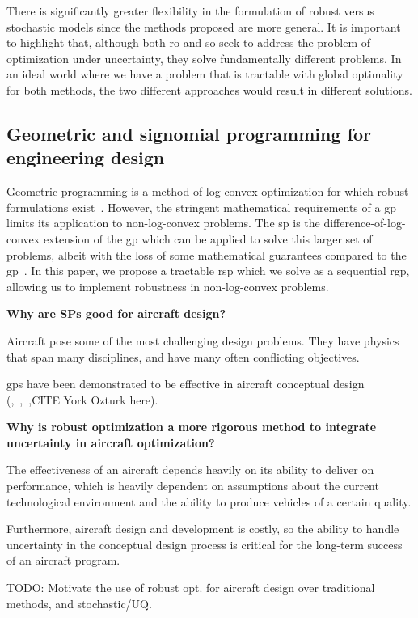 There is significantly greater flexibility in the formulation of robust versus stochastic models
since the methods proposed are more general. It is important to highlight that,
although both \gls{ro} and \gls{so} seek to address the problem
of optimization under uncertainty, they solve fundamentally different problems. In an ideal world where
we have a problem that is tractable with global optimality for both methods, the two different
approaches would result in different solutions.

\subsection{Geometric and signomial programming for engineering design}

Geometric programming is a method of log-convex optimization for which robust formulations exist~\cite{Saab2018}.
However, the stringent mathematical requirements of a \gls{gp} limits its application to non-log-convex problems.
The \gls{sp} is the difference-of-log-convex extension of the \gls{gp} which can be applied to
solve this larger set of problems, albeit with the loss of some mathematical guarantees compared to the \gls{gp}~\cite{Kirschen2016}.
In this paper, we propose a tractable \gls{rsp} which we solve as a sequential \gls{rgp},
allowing us to implement robustness in non-log-convex problems.

\textbf{Why are SPs good for aircraft design?}

Aircraft pose some of the most challenging design problems. They have physics that span many disciplines,
and have many often conflicting objectives.

\gls{gp}s have been demonstrated to be effective in aircraft conceptual design
(\cite{Hoburg2013},~\cite{Burton2017},~\cite{Kirschen2017},CITE York Ozturk here).

\textbf{Why is robust optimization a more rigorous method to integrate uncertainty in aircraft optimization?}

The effectiveness of an aircraft depends heavily on its
ability to deliver on performance, which is heavily dependent on assumptions about the
current technological environment and the ability to produce vehicles of a certain quality.

Furthermore, aircraft design and development is costly, so the ability to handle uncertainty in
the conceptual design process is critical for the long-term success of an aircraft program.

TODO: Motivate the use of robust opt. for aircraft design over traditional methods, and stochastic/UQ.

